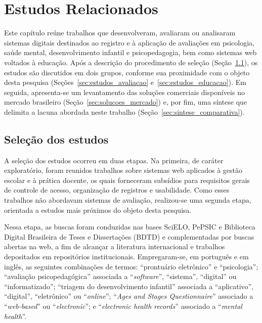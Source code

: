 \chapter[Estudos Relacionados]{Estudos Relacionados} \label{capitulo2}

Este capítulo reúne trabalhos que desenvolveram, avaliaram ou analisaram sistemas digitais destinados ao registro e à aplicação de avaliações em psicologia, saúde mental, desenvolvimento infantil e psicopedagogia, bem como sistemas web voltados à educação. Após a descrição do procedimento de seleção (Seção~\ref{sec:selecao_estudos}), os estudos são discutidos em dois grupos, conforme sua proximidade com o objeto desta pesquisa (Seções~\ref{sec:estudos_avaliacao} e~\ref{sec:estudos_educacao}). Em seguida, apresenta-se um levantamento das soluções comerciais disponíveis no mercado brasileiro (Seção~\ref{sec:solucoes_mercado}) e, por fim, uma síntese que delimita a lacuna abordada neste trabalho (Seção~\ref{sec:sintese_comparativa}).

\section{Seleção dos estudos}\label{sec:selecao_estudos}

A seleção dos estudos ocorreu em duas etapas. Na primeira, de caráter exploratório, foram reunidos trabalhos sobre sistemas web aplicados à gestão escolar e à prática docente, os quais forneceram subsídios para requisitos gerais de controle de acesso, organização de registros e usabilidade. Como esses trabalhos não abordavam sistemas de avaliação, realizou-se uma segunda etapa, orientada a estudos mais próximos do objeto desta pesquisa.

Nessa etapa, as buscas foram conduzidas nas bases SciELO, PePSIC e Biblioteca Digital Brasileira de Teses e Dissertações (BDTD) e complementadas por buscas abertas na web, a fim de alcançar a literatura internacional e trabalhos depositados em repositórios institucionais. Empregaram-se, em português e em inglês, as seguintes combinações de termos: ``prontuário eletrônico'' e ``psicologia''; ``avaliação psicopedagógica'' associada a ``\textit{software}'', ``sistema'', ``digital'' ou ``informatizado''; ``triagem do desenvolvimento infantil'' associada a ``aplicativo'', ``digital'', ``eletrônico'' ou ``\textit{online}''; ``\textit{Ages and Stages Questionnaire}'' associado a ``\textit{web-based}'' ou ``\textit{electronic}''; e ``\textit{electronic health records}'' associado a ``\textit{mental health}''.

